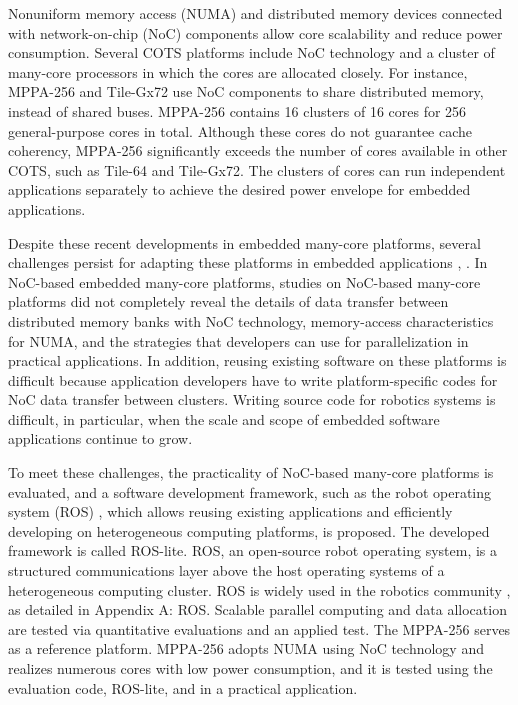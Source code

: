 Nonuniform memory access (NUMA) and distributed memory devices connected with network-on-chip (NoC) components allow core scalability and reduce power consumption.
Several COTS platforms include NoC technology and a cluster of many-core processors in which the cores are  allocated closely.
For instance, MPPA-256 and Tile-Gx72 use NoC components to share distributed memory, instead of shared buses.
MPPA-256 contains 16 clusters of 16 cores for 256 general-purpose cores in total.
Although these cores do not guarantee cache coherency, MPPA-256 significantly exceeds the number of cores available in other COTS, such as Tile-64 and Tile-Gx72.
The clusters of cores can run independent applications separately to achieve the desired power envelope for embedded applications.

Despite these recent developments in embedded many-core platforms, several challenges persist for adapting these platforms in embedded applications \cite{becker2016contention}, \cite{saidi2015shift}.
In NoC-based embedded many-core platforms, studies on NoC-based many-core platforms did not completely reveal the details of data transfer between distributed memory banks with NoC technology, memory-access characteristics for NUMA, and the strategies that developers can use for parallelization in practical applications.
In addition, reusing existing software on these platforms is difficult because application developers have to write platform-specific codes for NoC data transfer between clusters.
Writing source code for robotics systems is difficult, in particular, when the scale and scope of embedded software applications continue to grow.

To meet these challenges, the practicality of NoC-based many-core platforms is evaluated, and a software development framework, such as the robot operating system (ROS) \cite{quigley2009ros}, \cite{rosorg} which allows reusing existing applications and efficiently developing on heterogeneous computing platforms, is proposed.
The developed framework is called ROS-lite.
ROS, an open-source robot operating system, is a structured communications layer above the host operating systems of a heterogeneous computing cluster.
ROS is widely used in the robotics community \cite{cousins2011exponential}, as detailed in Appendix A: ROS.
Scalable parallel computing and data allocation are tested via quantitative evaluations and an applied test.
The MPPA-256 serves as a reference platform.
MPPA-256 \cite{de2014time} adopts NUMA using NoC technology and realizes numerous cores with low power consumption, and it is tested using the evaluation code, ROS-lite, and in a practical application.

